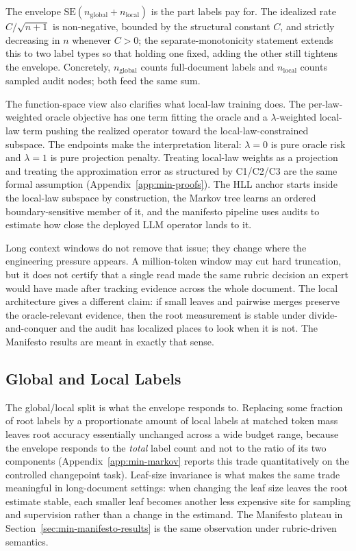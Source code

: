 The envelope $\text{SE}(n_{\mathrm{global}} + n_{\mathrm{local}})$ is the
part labels pay for. The idealized rate $C/\sqrt{n+1}$ is non-negative,
bounded by the structural constant $C$, and strictly decreasing in $n$
whenever $C > 0$; the separate-monotonicity statement extends this to two
label types so that holding one fixed, adding the other still tightens the
envelope. Concretely, $n_{\mathrm{global}}$ counts full-document labels and
$n_{\mathrm{local}}$ counts sampled audit nodes; both feed the same sum.

The function-space view also clarifies what local-law training does. The
per-law-weighted oracle objective has one term fitting the oracle and a
$\lambda$-weighted local-law term pushing the realized operator toward the
local-law-constrained subspace. The endpoints make the interpretation
literal: $\lambda = 0$ is pure oracle risk and $\lambda = 1$ is pure
projection penalty. Treating local-law weights as a projection and treating
the approximation error as structured by C1/C2/C3 are the same formal
assumption (Appendix~\ref{app:min-proofs}). The HLL anchor starts inside
the local-law subspace by construction, the Markov tree learns an ordered
boundary-sensitive member of it, and the manifesto pipeline uses audits to
estimate how close the deployed LLM operator lands to it.

Long context windows do not remove that issue; they change where the
engineering pressure appears. A million-token window may cut hard
truncation, but it does not certify that a single read made the same
rubric decision an expert would have made after tracking evidence across
the whole document. The local architecture gives a different claim: if
small leaves and pairwise merges preserve the oracle-relevant evidence,
then the root measurement is stable under divide-and-conquer and the audit
has localized places to look when it is not. The Manifesto results are
meant in exactly that sense.

\subsection{Global and Local Labels}\label{sec:min-global-local}

The global/local split is what the envelope responds to. Replacing
some fraction of root labels by a
proportionate amount of local labels at matched token mass leaves root
accuracy essentially unchanged across a wide budget range, because the
envelope responds to the \emph{total} label count and not to the ratio of
its two components (Appendix~\ref{app:min-markov} reports this trade
quantitatively on the controlled changepoint task). Leaf-size invariance
is what makes the same trade meaningful in long-document settings: when
changing the leaf size leaves the root estimate stable, each smaller
leaf becomes another less expensive site for sampling and supervision
rather than a change in the estimand. The Manifesto plateau in
Section~\ref{sec:min-manifesto-results} is the same observation under
rubric-driven semantics.

